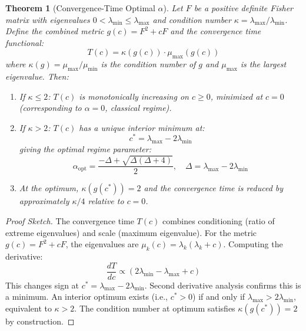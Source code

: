 \documentclass[10pt,a4paper]{amsart}
\newtheorem{theorem}{Theorem}
\begin{document}
\begin{theorem}[Convergence-Time Optimal $\alpha$]
\label{thm:optimal_alpha}
Let $F$ be a positive definite Fisher matrix with eigenvalues $0 < \lambda_{\min} \leq \lambda_{\max}$ and condition number $\kappa = \lambda_{\max}/\lambda_{\min}$. Define the combined metric $g(c) = F^2 + cF$ and the convergence time functional:
\begin{equation}
T(c) = \kappa(g(c)) \cdot \mu_{\max}(g(c))
\end{equation}
where $\kappa(g) = \mu_{\max}/\mu_{\min}$ is the condition number of $g$ and $\mu_{\max}$ is the largest eigenvalue. Then:

\begin{enumerate}[noitemsep]
\item If $\kappa \leq 2$: $T(c)$ is monotonically increasing on $c \geq 0$, minimized at $c = 0$ (corresponding to $\alpha = 0$, classical regime).

\item If $\kappa > 2$: $T(c)$ has a unique interior minimum at:
\begin{equation}
c^* = \lambda_{\max} - 2\lambda_{\min}
\end{equation}
giving the optimal regime parameter:
\begin{equation}
\alpha_{\mathrm{opt}} = \frac{-\Delta + \sqrt{\Delta(\Delta + 4)}}{2}, \quad \Delta = \lambda_{\max} - 2\lambda_{\min}
\end{equation}

\item At the optimum, $\kappa(g(c^*)) = 2$ and the convergence time is reduced by approximately $\kappa/4$ relative to $c = 0$.
\end{enumerate}
\end{theorem}

\begin{proof}[Proof Sketch]
The convergence time $T(c)$ combines conditioning (ratio of extreme eigenvalues) and scale (maximum eigenvalue). For the metric $g(c) = F^2 + cF$, the eigenvalues are $\mu_k(c) = \lambda_k(\lambda_k + c)$. Computing the derivative:
\begin{equation}
\frac{dT}{dc} \propto (2\lambda_{\min} - \lambda_{\max} + c)
\end{equation}
This changes sign at $c^* = \lambda_{\max} - 2\lambda_{\min}$. Second derivative analysis confirms this is a minimum. An interior optimum exists (i.e., $c^* > 0$) if and only if $\lambda_{\max} > 2\lambda_{\min}$, equivalent to $\kappa > 2$. The condition number at optimum satisfies $\kappa(g(c^*)) = 2$ by construction.
\end{proof}
\end{document}

